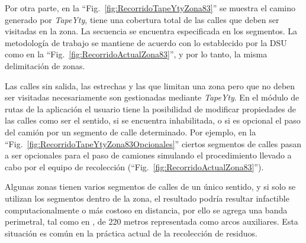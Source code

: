 Por otra parte, en la ``Fig.~\ref{fig:RecorridoTapeYtyZona83}'' se muestra el camino generado por \textit{TapeYty}, tiene una cobertura total de las calles que deben ser visitadas en la zona. La secuencia se encuentra especificada en los segmentos. La metodología de trabajo se mantiene de acuerdo con lo establecido por la DSU como en la ``Fig.~\ref{fig:RecorridoActualZona83}'', y por lo tanto, la misma delimitación de zonas.

Las calles sin salida, las estrechas y las que limitan una zona pero que no deben ser visitadas necesariamente son gestionadas mediante \textit{TapeYty}. En el módulo de rutas de la aplicación el usuario tiene la posibilidad de modificar propiedades de las calles como ser el sentido, si se encuentra inhabilitada, o si es opcional el paso del camión por un segmento de calle determinado. Por ejemplo, en la ``Fig.~\ref{fig:RecorridoTapeYtyZona83Opcionales}'' ciertos segmentos de calles pasan a ser opcionales para el paso de camiones simulando el procedimiento llevado a cabo por el equipo de recolección (``Fig.~\ref{fig:RecorridoActualZona83}'').

Algunas zonas tienen varios segmentos de calles de un único sentido, y si solo se utilizan los segmentos dentro de la zona, el resultado podría resultar infactible computacionalmente o más costoso en distancia, por ello se agrega una banda perimetral, tal como en \citet{Braier2017AnArgentina}, de 220 metros representada como arcos auxiliares. Esta situación es común en la práctica actual de la recolección de residuos.


